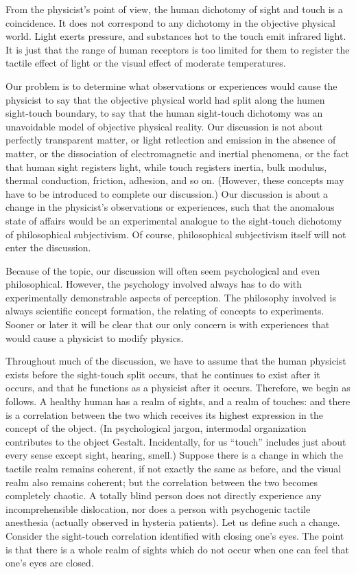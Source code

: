 
From the physicist's point of view, the human dichotomy of sight and touch is a coincidence. It does not correspond to any dichotomy in the objective physical world. Light exerts pressure, and substances hot to the touch emit infrared light. It is just that the range of human receptors is too limited for them to register the tactile effect of light or the visual effect of moderate temperatures. 

Our problem is to determine what observations or experiences would cause the physicist to say that the objective physical world had split along the humen sight-touch boundary, to say that the human sight-touch dichotomy was an unavoidable model of objective physical reality. Our discussion is not about perfectly transparent matter, or light retlection and emission in the absence of matter, or the dissociation of electromagnetic and inertial phenomena, or the fact that human sight registers light, while touch registers inertia, bulk modulus, thermal conduction, friction, adhesion, and so on. (However, these concepts may have to be introduced to complete our discussion.) Our discussion is about a change in the physicist's observations or experiences, such that the anomalous state of affairs would be an experimental analogue to the sight-touch dichotomy of philosophical subjectivism. Of course, philosophical subjectivism itself will not enter the discussion. 

Because of the topic, our discussion will often seem psychological and even philosophical. However, the psychology involved always has to do with experimentally demonstrable aspects of perception. The philosophy involved is always scientific concept formation, the relating of concepts to experiments. Sooner or later it will be clear that our only concern is with experiences that would cause a physicist to modify physics. 

Throughout much of the discussion, we have to assume that the human physicist exists before the sight-touch split occurs, that he continues to exist after it occurs, and that he functions as a physicist after it occurs. Therefore, we begin as follows. A healthy human has a realm of sights, and a realm of touches: and there is a correlation between the two which receives its highest expression in the concept of the object. (In psychological jargon, intermodal organization contributes to the object Gestalt. Incidentally, for us \enquote{touch} includes just about every sense except sight, hearing, smell.) Suppose there is a change in which the tactile realm remains coherent, if not exactly the same as before, and the visual realm also remains coherent; but the correlation between the two becomes completely chaotic. A totally blind person does not directly experience any incomprehensible dislocation, nor does a person with psychogenic tactile anesthesia (actually observed in hysteria patients). Let us define such a change. Consider the sight-touch correlation identified with closing one's eyes. The point is that there is a whole realm of sights which do not occur when one can feel that one's eyes are closed. 

